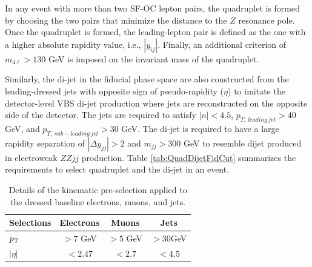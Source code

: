 In any event with more than two SF-OC lepton pairs, the quadruplet is formed by choosing the two pairs that minimize the distance to the $Z$ resonance pole. Once the quadruplet is formed, the leading-lepton pair is defined as the one with a higher absolute rapidity value, i.e., $|y_{ij}|$. Finally, an additional criterion of $m_{4\ell} > 130$ GeV is imposed on the invariant mass of the quadruplet. 

Similarly, the di-jet in the fiducial phase space are also constructed from the leading-dressed jets with opposite sign of pseudo-rapidity ($\eta$) to imitate the detector-level VBS di-jet production where jets are reconstructed on the opposite side of the detector. The jets are required to satisfy $|n| < 4.5$, $p_{T,~leading~jet} > 40$ GeV, and $p_{T,~sub-leading~jet} > 30$ GeV. The di-jet is required to have a large rapidity separation of $|\Delta y_{jj}| > 2$ and $m_{jj} > 300$ GeV to resemble dijet produced in electroweak $ZZjj$ production. Table \ref{tab:QuadDijetFidCut} summarizes the requirements to select quadruplet and the di-jet in an event.

\begin{table}[ht]
	\centering
	\caption{Details of the kinematic pre-selection applied to the dressed baseline electrons, muons, and jets.
	\label{tab:FidObjectCut}}
	\begin{tabular}{|| l || c | c | c ||}
		\hline
		Selections 		& Electrons 			& 		Muons		 & 			Jets 			\\
		\hline\hline
		$p_{\textrm{T} ~}$ 			& $> 7$ GeV 			& 		$ >5$ GeV  	 & 		$>30$GeV 		\\
		\hline 
		$|\eta|$			&  $< 2.47	$			& 		$ < 2.7 $		 &		$ < 4.5$ 			\\
		\hline
	\end{tabular}
\end{table}				
	
